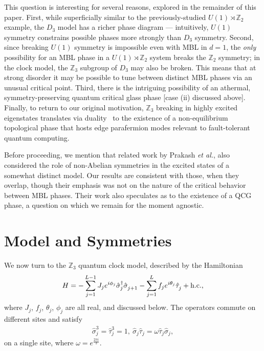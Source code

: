 \documentclass[prb,aps, twocolumn, superscriptaddress]{revtex4-1}
\newcommand{\be}{\begin{eqnarray}}
\newcommand{\ee}{\end{eqnarray}}
\begin{document}
This question is interesting for several reasons, explored in the remainder of this paper. First, while superficially similar to the previously-studied $U(1)\rtimes {\mathbb{Z}_2}$ example, the $D_3$ model has a richer phase diagram --- intuitively, $U(1)$ symmetry constrains possible phases more strongly than  $D_3$ symmetry.  Second, since breaking $U(1)$ symmetry is impossible even with MBL in $d=1$, the {\it only} possibility for an MBL phase in a $U(1)\rtimes {\mathbb{Z}_2}$ system breaks the ${\mathbb{Z}_2}$ symmetry; in the clock model, the ${\mathbb{Z}_3}$ subgroup of $D_3$ may also be broken. This means that at strong disorder it may be possible to tune between distinct MBL phases via an unusual critical point.  Third, there is the intriguing possibility of an athermal, symmetry-preserving quantum critical glass phase [case (ii) discussed above]. Finally, {to return to our original motivation}, ${\mathbb{Z}_3}$ breaking in highly excited eigenstates translates via duality~\cite{Parafendlions} to the existence of a non-equilibrium topological phase that hosts edge parafermion modes relevant to fault-tolerant quantum computing. 

Before proceeding, we mention that  related work by Prakash \emph{et al.}\cite{SUNYPotts}, also considered the role of non-Abelian symmetries in the excited states of a somewhat distinct model. Our results are consistent with those, when they overlap, though their emphasis was not on the nature of the critical behavior between MBL phases. Their work also speculates as to the existence of a QCG phase, a question on which we remain for the moment agnostic.





\section{Model and Symmetries} We now turn to the ${\mathbb{Z}_3}$  quantum clock model, described by the Hamiltonian {
\be \label{eq:Ham} H =  -\sum_{j=1}^{L-1}J_j  e^{i \phi_j} {\hat{\sigma}}^{\dagger}_j {\hat{\sigma}}^{\vphantom{\dagger}}_{j+1} -  \sum_{j=1}^Lf_j e^{i\theta_j} {\hat{\tau}}^{\vphantom{\dagger}}_j    + \text{h.c.},\ee}%
where $J_j$, $f_j$, $\theta_j$, $\phi_j$ are all real, and discussed below. The operators commute on different sites and satisfy 
\be
{\hat{\sigma}}_j^3 = {\hat{\tau}}_j^3=1, ~ {\hat{\sigma}}_j {\hat{\tau}}_j = \omega {\hat{\tau}}_j {\hat{\sigma}}_j,
\ee
on a single site, where $\omega = e^{\frac{2 \pi i}3}$. 
\end{document}
